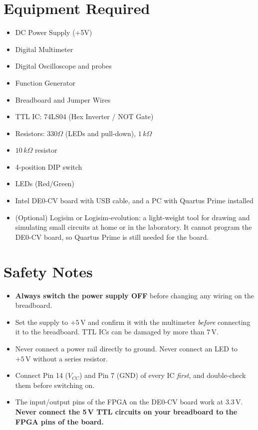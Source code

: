 \documentclass{article}
\begin{document}
\section*{Equipment Required}
\begin{itemize}
    \item DC Power Supply (+5V)
    \item Digital Multimeter
    \item Digital Oscilloscope and probes
    \item Function Generator
    \item Breadboard and Jumper Wires
    \item TTL IC: 74LS04 (Hex Inverter / NOT Gate)
    \item Resistors: $330\Omega$ (LEDs and pull-down), $1\,k\Omega$
    \item $10\,k\Omega$ resistor
    \item 4-position DIP switch
    \item LEDs (Red/Green)
    \item Intel DE0-CV board with USB cable, and a PC with Quartus Prime installed
    \item (Optional) Logisim or Logisim-evolution: a light-weight tool for drawing and simulating small circuits at home or in the laboratory. It cannot program the DE0-CV board, so Quartus Prime is still needed for the board.
\end{itemize}

\section*{Safety Notes}
\begin{itemize}
    \item \textbf{Always switch the power supply OFF} before changing any wiring on the breadboard.
    \item Set the supply to $+5\,\mathrm{V}$ and confirm it with the multimeter \emph{before} connecting it to the breadboard. TTL ICs can be damaged by more than $7\,\mathrm{V}$.
    \item Never connect a power rail directly to ground. Never connect an LED to $+5\,\mathrm{V}$ without a series resistor.
    \item Connect Pin 14 ($V_{CC}$) and Pin 7 (GND) of every IC \emph{first}, and double-check them before switching on.
    \item The input/output pins of the FPGA on the DE0-CV board work at $3.3\,\mathrm{V}$. \textbf{Never connect the 5\,V TTL circuits on your breadboard to the FPGA pins of the board.}
\end{itemize}
\end{document}
